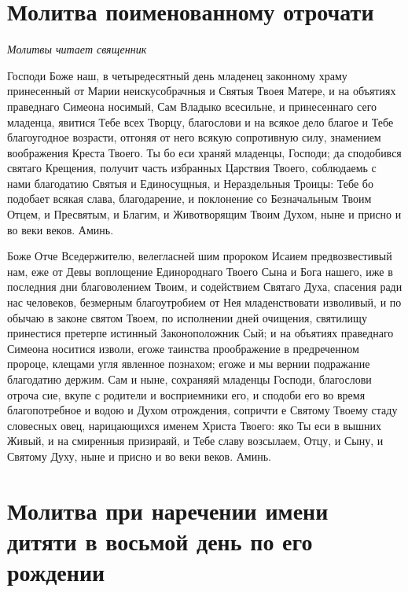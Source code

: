 \bigskip\bigskip\mychapterending


 

\section{Молитва поименованному отрочати}
 


\itshape Молитвы читает священник\normalfont{}

Господи Боже наш, в четыредесятный день младенец законному храму принесенный от Марии неискусобрачныя и Святыя Твоея Матере, и на объятиях праведнаго Симеона носимый, Сам Владыко всесильне, и принесеннаго сего младенца, явитися Тебе всех Творцу, благослови и на всякое дело благое и Тебе благоугодное возрасти, отгоняя от него всякую сопротивную силу, знамением воображения Креста Твоего. Ты бо еси храняй младенцы, Господи; да сподобився святаго Крещения, получит часть избранных Царствия Твоего, соблюдаемь с нами благодатию Святыя и Единосущныя, и Нераздельныя Троицы: Тебе бо подобает всякая слава, благодарение, и поклонение со Безначальным Твоим Отцем, и Пресвятым, и Благим, и Животворящим Твоим Духом, ныне и присно и во веки веков. Аминь. 


Боже Отче Вседержителю, велегласней шим пророком Исаием предвозвестивый нам, еже от Девы воплощение Единороднаго Твоего Сына и Бога нашего, иже в последния дни благоволением Твоим, и содействием Святаго Духа, спасения ради нас человеков, безмерным благоутробием от Нея младенствовати изволивый, и по обычаю в законе святом  Твоем, по исполнении дней очищения, святилищу принестися претерпе истинный Законоположник Сый; и на объятиях праведнаго Симеона носитися изволи, егоже таинства проображение в предреченном пророце, клещами угля явленное познахом; егоже и мы вернии подражание благодатию держим. Сам и ныне, сохраняяй младенцы Господи, благослови отроча сие, вкупе с родители и восприемники его, и сподоби его во время благопотребное и водою и Духом отрождения, сопричти е Святому Твоему стаду словесных овец, нарицающихся именем Христа Твоего: яко Ты еси в вышних Живый, и на смиренныя призираяй, и Тебе славу возсылаем, Отцу, и Сыну, и Святому Духу, ныне и присно и во веки веков. Аминь.





\section{Молитва при наречении имени дитяти в восьмой день по его рождении}
 


